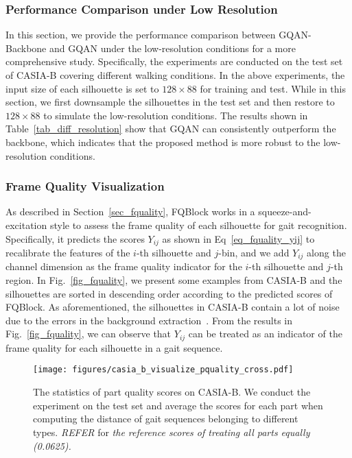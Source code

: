 \subsubsection{Performance Comparison under Low Resolution}
In this section, we provide the performance comparison between GQAN-Backbone and GQAN under the low-resolution conditions for a more comprehensive study.
%
Specifically, the experiments are conducted on the test set of CASIA-B covering different walking conditions.
%
In the above experiments, the input size of each silhouette is set to $128 \times 88$ for training and test.
%
While in this section, we first downsample the silhouettes in the test set and then restore to $128 \times 88$ to simulate the low-resolution conditions.
%
The results shown in Table~\ref{tab_diff_resolution} show that GQAN can consistently outperform the backbone, which indicates that the proposed method is more robust to the low-resolution conditions.

\subsubsection{Frame Quality Visualization}
\label{sec_frame_vis}
As described in Section~\ref{sec_fquality}, FQBlock works in a squeeze-and-excitation style to assess the frame quality of each silhouette for gait recognition.
%
Specifically, it predicts the scores $Y_{ij}$ as shown in Eq~\eqref{eq_fquality_yij} to recalibrate the features of the $i$-th silhouette and $j$-bin,
%
and we add $Y_{ij}$ along the channel dimension as the frame quality indicator for the $i$-th silhouette and $j$-th region.
%
In Fig.~\ref{fig_fquality}, we present some examples from CASIA-B and the silhouettes are sorted in descending order according to the predicted scores of FQBlock.
%
As aforementioned, the silhouettes in CASIA-B contain a lot of noise due to the errors in the background extraction~\cite{yu2006framework}.
%
From the results in Fig.~\ref{fig_fquality}, we can observe that $Y_{ij}$ can be treated as an indicator of the frame quality for each silhouette in a gait sequence.
%

\begin{figure}[t]
	\centering
	\texttt{[image: figures/casia\_b\_visualize\_pquality\_cross.pdf]}
	\caption{
		The statistics of part quality scores on CASIA-B.
		We conduct the experiment on the test set and average the scores for each part when computing the distance of gait sequences belonging to different types.
		\emph{REFER} for \emph{the reference scores of treating all parts equally (0.0625).}
	}
	\label{fig_pquality_cross}
\end{figure}

